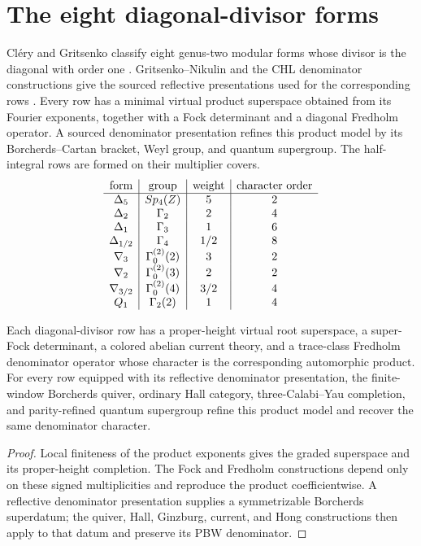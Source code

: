 \chapter{The eight diagonal-divisor forms}
Cl\'ery and Gritsenko classify eight genus-two modular forms whose divisor is the diagonal with order one \cite{GC}.  Gritsenko--Nikulin and the CHL denominator constructions give the sourced reflective presentations used for the corresponding rows \cite{GN97,GN98a,GN98b,GovindarajanKrishna2009,Govindarajan2011,GovindarajanSamanta2019}.  Every row has a minimal virtual product superspace obtained from its Fourier exponents, together with a Fock determinant and a diagonal Fredholm operator.  A sourced denominator presentation refines this product model by its Borcherds--Cartan bracket, Weyl group, and quantum supergroup.  The half-integral rows are formed on their multiplier covers.
\[
\begin{array}{c|c|c|c}
\text{form}&\text{group}&\text{weight}&\text{character order}\\ \hline
\Delta_5&Sp_4(Z)&5&2\\
\Delta_2&\Gamma_2&2&4\\
\Delta_1&\Gamma_3&1&6\\
\Delta_{1/2}&\Gamma_4&1/2&8\\
\nabla_3&\Gamma^{(2)}_0(2)&3&2\\
\nabla_2&\Gamma^{(2)}_0(3)&2&2\\
\nabla_{3/2}&\Gamma^{(2)}_0(4)&3/2&4\\
Q_1&\Gamma_2(2)&1&4
\end{array}
\]

\begin{theorem}
Each diagonal-divisor row has a proper-height virtual root superspace, a super-Fock determinant, a colored abelian current theory, and a trace-class Fredholm denominator operator whose character is the corresponding automorphic product.  For every row equipped with its reflective denominator presentation, the finite-window Borcherds quiver, ordinary Hall category, three-Calabi--Yau completion, and parity-refined quantum supergroup refine this product model and recover the same denominator character.
\end{theorem}
\begin{proof}
Local finiteness of the product exponents gives the graded superspace and its proper-height completion.  The Fock and Fredholm constructions depend only on these signed multiplicities and reproduce the product coefficientwise.  A reflective denominator presentation supplies a symmetrizable Borcherds superdatum; the quiver, Hall, Ginzburg, current, and Hong constructions then apply to that datum and preserve its PBW denominator.
\end{proof}

